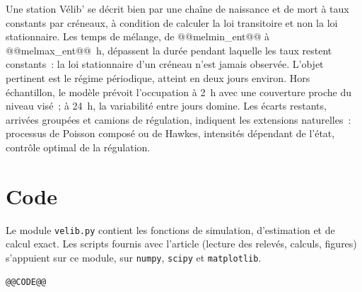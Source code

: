 Une station Vélib' se décrit bien par une chaîne de naissance et de mort à taux constants par créneaux, à condition de calculer la loi transitoire et non la loi stationnaire. Les temps de mélange, de @@melmin_ent@@ à @@melmax_ent@@~h, dépassent la durée pendant laquelle les taux restent constants~: la loi stationnaire d'un créneau n'est jamais observée. L'objet pertinent est le régime périodique, atteint en deux jours environ. Hors échantillon, le modèle prévoit l'occupation à 2~h avec une couverture proche du niveau visé~; à 24~h, la variabilité entre jours domine. Les écarts restants, arrivées groupées et camions de régulation, indiquent les extensions naturelles~: processus de Poisson composé ou de Hawkes, intensités dépendant de l'état, contrôle optimal de la régulation.

\appendix
\section{Code}\label{sec:code}

Le module \texttt{velib.py} contient les fonctions de simulation, d'estimation et de calcul exact. Les scripts fournis avec l'article (lecture des relevés, calculs, figures) s'appuient sur ce module, sur \texttt{numpy}, \texttt{scipy} et \texttt{matplotlib}.

\begin{lstlisting}[style=py]
@@CODE@@
\end{lstlisting}


